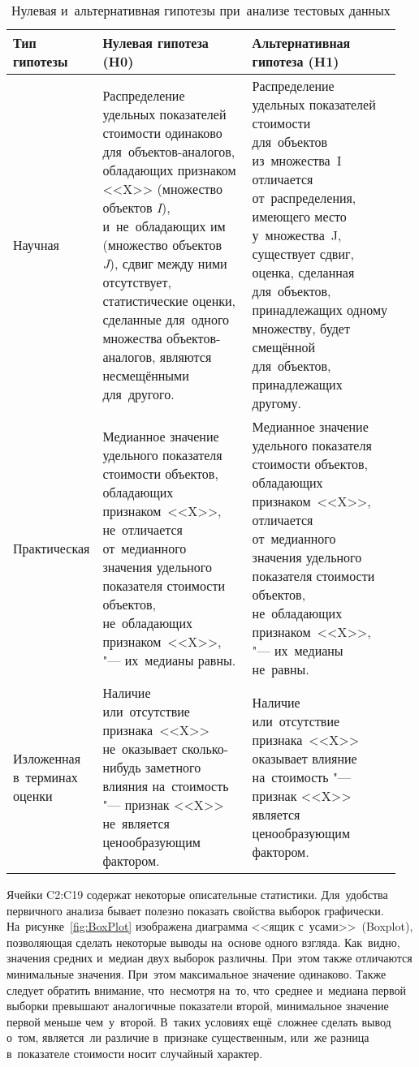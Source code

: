 \documentclass[]{scrartcl}
\begin{document}
\begin{table}[ht]
	\caption{Нулевая и~альтернативная гипотезы при~анализе тестовых данных}  \label{tab:nul-alt-hypothesis-variants}
	\centering
	\begin{tabularx}{\textwidth}{p{0.15\linewidth} p{0.4\linewidth} p{0.4\linewidth}} 
		\hline
		Тип гипотезы&Нулевая гипотеза (H0)&Альтернативная гипотеза (H1)\\
		\hline
		Научная&Распределение удельных показателей стоимости одинаково для~объектов-аналогов, обладающих признаком <<X>> (множество объектов \textit{I}), и~не~обладающих им (множество объектов \textit{J}), сдвиг между ними отсутствует, статистические оценки, сделанные для~одного множества объектов-аналогов, являются несмещёнными для~другого.&Распределение удельных показателей стоимости для~объектов из~множества~I отличается от~распределения, имеющего место у~множества~J, существует сдвиг, оценка, сделанная для~объектов, принадлежащих одному множеству, будет смещённой для~объектов, принадлежащих другому.\\
		\hline
		Практическая&Медианное значение удельного показателя стоимости объектов, обладающих признаком~<<X>>, не~отличается от~медианного значения удельного показателя стоимости объектов, не~обладающих признаком~<<X>>, "--- их~медианы равны.&Медианное значение удельного показателя стоимости объектов, обладающих признаком~<<X>>, отличается от~медианного значения удельного показателя стоимости объектов, не~обладающих признаком~<<X>>, "--- их~медианы не~равны.\\
		\hline
		Изложенная в~терминах оценки&Наличие или~отсутствие признака~<<X>> не~оказывает сколько-нибудь заметного влияния на~стоимость "--- признак <<X>> не~является ценообразующим фактором.&Наличие или~отсутствие признака~<<X>> оказывает влияние на~стоимость "--- признак <<X>> является ценообразующим фактором.\\ \hline
	\end{tabularx}
\end{table}
Ячейки C2:C19 содержат некоторые описательные статистики.  Для~удобства первичного анализа бывает полезно показать свойства выборок графически. На~рисунке~\ref{fig:BoxPlot} изображена диаграмма <<ящик с~усами>>~(\foreignlanguage{english}{Boxplot}), позволяющая сделать некоторые выводы на~основе одного взгляда. Как~видно, значения средних и~медиан двух выборок различны. При~этом также отличаются минимальные значения. При~этом максимальное значение одинаково. Также следует обратить внимание, что~несмотря на~то, что~среднее и~медиана первой выборки превышают аналогичные показатели второй, минимальное значение первой меньше чем~у~второй. В~таких условиях ещё~сложнее сделать вывод о~том, является~ли различие в~признаке существенным, или~же разница в~показателе стоимости носит случайный характер.
\end{document}
